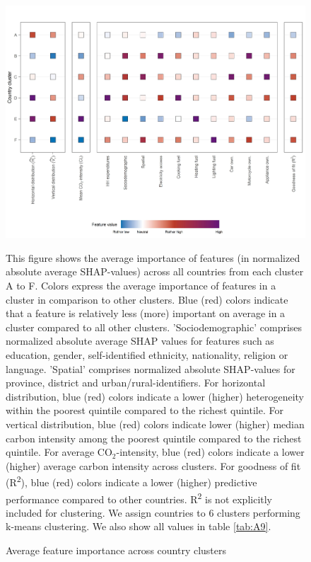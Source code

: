 \documentclass[12pt, a4paper]{article}
\newenvironment{subcaption2}
{\strut
\vspace{-5pt}
\begin{minipage}[b]{0.9\textwidth}
  \hspace*{-\parindent}
  \footnotesize}
 {\end{minipage}}
\begin{document}
\begin{figure}[ht!]
    \centering
    \includegraphics{1_Figures/Figure 3/Figure_3_Corrected.jpg}
    \caption{Average feature importance across country clusters}
    \label{fig:fig_3}
    \begin{subcaption2}
    This figure shows the average importance of features (in normalized absolute average SHAP-values) across all countries from each cluster A to F. Colors express the average importance of features in a cluster in comparison to other clusters. Blue (red) colors indicate that a feature is relatively less (more) important on average in a cluster compared to all other clusters. 'Sociodemographic' comprises normalized absolute average SHAP values for features such as education, gender, self-identified ethnicity, nationality, religion or language. 'Spatial' comprises normalized absolute SHAP-values for province, district and urban/rural-identifiers. For horizontal distribution, blue (red) colors indicate a lower (higher) heterogeneity within the poorest quintile compared to the richest quintile. For vertical distribution, blue (red) colors indicate lower (higher) median carbon intensity among the poorest quintile compared to the richest quintile. For average CO$_{2}$-intensity, blue (red) colors indicate a lower (higher) average carbon intensity across clusters. For goodness of fit (R\textsuperscript{2}), blue (red) colors indicate a lower (higher) predictive performance compared to other countries. R\textsuperscript{2} is not explicitly included for clustering. We assign countries to 6 clusters performing k-means clustering. We also show all values in table \ref{tab:A9}.
    \end{subcaption2}
\end{figure}
\end{document}
